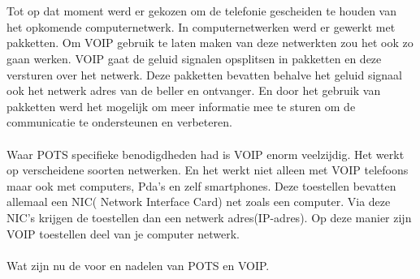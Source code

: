 \documentclass[pdftex,a4paper,12pt,twoside]{report}
\begin{document}
\\ \\
Tot op dat moment werd er gekozen om de telefonie gescheiden te houden van het opkomende computernetwerk. In computernetwerken werd er gewerkt met pakketten. Om VOIP gebruik te laten maken van deze netwerkten zou het ook zo gaan werken. VOIP gaat de geluid signalen opsplitsen in pakketten en deze versturen over het netwerk. Deze pakketten bevatten behalve het geluid signaal ook het netwerk adres van de beller en ontvanger. En door het gebruik van pakketten werd het mogelijk om meer informatie mee te sturen om de communicatie te ondersteunen en verbeteren. 
\\ \\
Waar POTS specifieke benodigdheden had is VOIP enorm veelzijdig. Het werkt op verscheidene soorten netwerken. En het werkt niet alleen met VOIP telefoons maar ook met computers, Pda’s en zelf smartphones. Deze toestellen bevatten allemaal een NIC( Network Interface Card) net zoals een computer. Via deze NIC’s krijgen de toestellen dan een netwerk adres(IP-adres). Op deze manier zijn VOIP toestellen deel van je computer netwerk. \\ \\
Wat zijn nu de voor en nadelen van POTS en VOIP.\\
\end{document}
